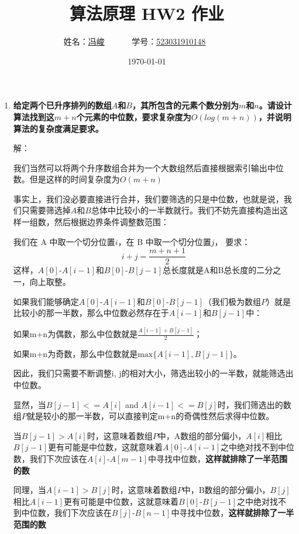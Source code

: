 \documentclass[UTF8,12pt,a4paper]{ctexart}
\title{算法原理 HW2 作业}
\author{
	姓名：\underline{冯峻}~~~~~~
	学号：\underline{523031910148}~~~~~~}
\date{\today}
\begin{document}
\fancyfoot[C]{\thepage}

\maketitle

\begin{enumerate}[1.]
	\item \textbf{给定两个已升序排列的数组$A$和$B$，其所包含的元素个数分别为$m$和$n$。请设计算法找到这$m+n$个元素的中位数，要求复杂度为$O(log(m+n))$，并说明算法的复杂度满足要求。}
	
	解：
	
	我们当然可以将两个升序数组合并为一个大数组然后直接根据索引输出中位数。但是这样的时间复杂度为$O(m+n)$

	事实上，我们没必要直接进行合并，我们要筛选的只是中位数，也就是说，我们只需要筛选掉$A$和$B$总体中比较小的一半数就行。我们不妨先直接构造出这样一组数，然后根据边界条件调整数范围：

	我们在 A 中取一个切分位置$i$，在 B 中取一个切分位置$j$， 要求：
	\begin{equation}
		i + j = \frac{m+n+1}{2}
	\end{equation}
	这样，$A[0]$-$A[i-1]$和$B[0]$-$B[j-1]$总长度就是A和B总长度的二分之一，向上取整。

	如果我们能够确定$A[0]$-$A[i-1]$和$B[0]$-$B[j-1]$（我们极为数组$P$）就是比较小的那一半数，那么中位数必然存在于$A[i-1]$和$B[j-1]$中：

	如果m+n为偶数，那么中位数就是$\frac{A[i-1]+B[j-1]}{2}$；

	如果m+n为奇数，那么中位数就是$\text{max}\{A[i-1], B[j-1]\}$。

	因此，我们只需要不断调整i, j的相对大小，筛选出较小的一半数，就能筛选出中位数。

	显然，当$B[j-1] <= A[i]$ and $A[i-1] <= B[j]$时，我们筛选出的数组$P$就是较小的那一半数，可以直接判定m+n的奇偶性然后求得中位数。

	当$B[j-1] > A[i]$时，这意味着数组$P$中，A数组的部分偏小，$A[i]$相比$B[j-1]$更有可能是中位数，这就意味着$A[0]$-$A[i-1]$之中绝对找不到中位数，我们下次应该在$A[i]$-$A[m-1]$中寻找中位数，\textbf{这样就排除了一半范围的数}

	同理，当$A[i-1] > B[j]$时，这意味着数组$P$中，B数组的部分偏小，$B[j]$相比$A[i-1]$更有可能是中位数，这就意味着$B[0]$-$B[j-1]$之中绝对找不到中位数，我们下次应该在$B[j]$-$B[n-1]$中寻找中位数，\textbf{这样就排除了一半范围的数}


\end{enumerate}
\end{document}
